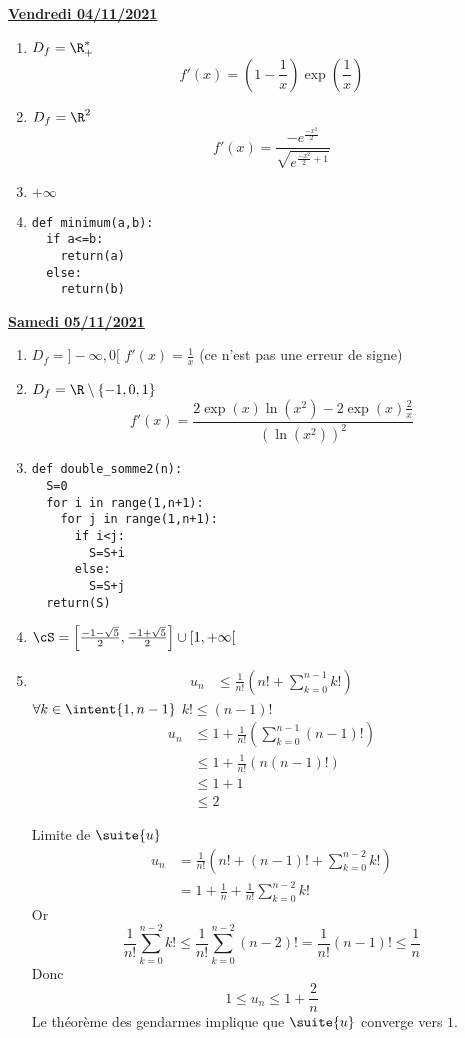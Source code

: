 \documentclass[a4paper, 11pt,reqno]{article}
\newcommand{\jour}[1]{
\begin{center}
\underline{\textbf{#1}}
\end{center}

 }
\begin{document}
\newpage
\jour{Vendredi 04/11/2021}
\begin{correction}
\begin{enumerate}
\item $D_f = \R_+^*$
$$f'(x) =\left( 1 -\frac{1}{x}\right)\exp\left(\frac{1}{x}\right)$$
\item $D_f=\R^2$
$$f'(x) =\frac{-e^{\frac{-x^2}{2}}}{\sqrt{e^{\frac{-x^2}{2}+1}}}$$



\item $+\infty$
\item 
\begin{lstlisting}
def minimum(a,b):
  if a<=b:
    return(a)
  else:
    return(b)
\end{lstlisting}


\end{enumerate}
\end{correction} 
\newpage
\jour{Samedi 05/11/2021}
\begin{correction}
\begin{enumerate}
\item $D_f =]-\infty, 0[$
$f'(x) =\frac{1}{x}$ (ce n'est pas une erreur de signe) 
\item 
$D_f = \R\setminus\{ -1,0,1\} $
$$f'(x) = \frac{2\exp(x)\ln(x^2)- 2\exp(x) \frac{2}{x}}{(\ln(x^2))^2}$$

\item 
\begin{lstlisting}
def double_somme2(n):
  S=0
  for i in range(1,n+1):
    for j in range(1,n+1):
      if i<j:
        S=S+i
      else:
        S=S+j
  return(S)
\end{lstlisting}


\item $\cS = \left[\frac{-1-\sqrt{5}}{2}, \frac{-1+\sqrt{5}}{2} \right]\cup [1,+\infty[$
\item 
\begin{align*}
u_n &\leq \frac{1}{n! } (n! +\sum_{k=0}^{n-1} k!)
\end{align*}
$\forall k\in \intent{1,n-1}$ $k! \leq (n-1)!$
\begin{align*}
u_n  & \leq 1+\frac{1}{n! } (\sum_{k=0}^{n-1} (n-1)!)\\
 & \leq 1+\frac{1}{n! } (n (n-1)!)\\
  & \leq 1+1\\
    & \leq 2
\end{align*}


Limite de $\suite{u}$
\begin{align*}
u_n &= \frac{1}{n!} \left( n! +(n-1)! +\sum_{k=0}^{n-2} k! \right)\\
		&= 1  +\frac{1}{n}+\frac{1}{n!}\sum_{k=0}^{n-2} k! 
\end{align*}
Or 
$$\frac{1}{n!}\sum_{k=0}^{n-2} k ! \leq \frac{1}{n!}\sum_{k=0}^{n-2} (n-2)!=\frac{1}{n!}  (n-1)! \leq \frac{1}{n}$$
Donc
$$1\leq u_n \leq 1  +\frac{2}{n}$$
Le théorème des gendarmes implique que $\suite{u}$ converge vers $1$. 





	 
\end{enumerate}
\end{correction} 
\end{document}
